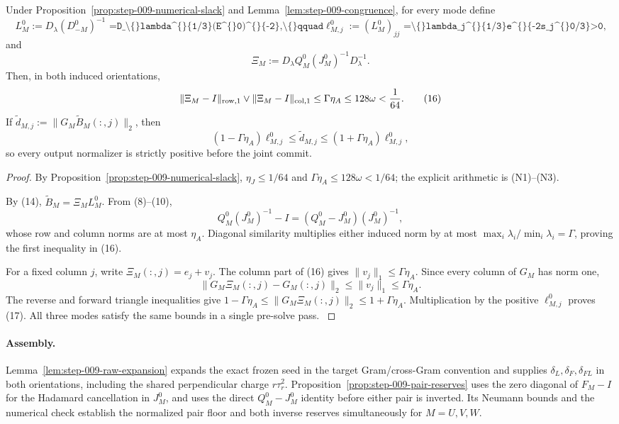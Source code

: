 \begin{proposition}\label{prop:step-009-normalizer}
Under Proposition~\ref{prop:step-009-numerical-slack}
and Lemma~\ref{lem:step-009-congruence}, for
every mode define
\[
L_M^0:=D_\lambda(D_{-M}^0)^{-1}
\texttt{   =D\_\textbackslash\{\}lambda\textasciicircum\{\}\{1/3\}(E\textasciicircum\{\}0)\textasciicircum\{\}\{-2\},\textbackslash\{\}qquad}
\ell_{M,j}^0:=(L_M^0)_{jj}
\texttt{   =\textbackslash\{\}lambda\_j\textasciicircum\{\}\{1/3\}e\textasciicircum\{\}\{-2s\_j\textasciicircum\{\}0/3\}>0,}
\]
and
\[
\Xi_M:=D_\lambda Q_M^0(J_M^0)^{-1}D_\lambda^{-1}.
\]
Then, in both induced orientations,
\[
\|\Xi_M-I\|_{\rm row,1}\vee\|\Xi_M-I\|_{\rm col,1}
\le\Gamma\eta_A\le128\omega<\frac1{64}. \tag{16}
\]
If \(\widetilde d_{M,j}:=\|G_M\widetilde B_M(:,j)\|_2\), then
\[
(1-\Gamma\eta_A)\ell_{M,j}^0
\le\widetilde d_{M,j}
\le(1+\Gamma\eta_A)\ell_{M,j}^0, \tag{17}
\]
so every output normalizer is strictly positive before the joint commit.

\begin{proof}

By Proposition~\ref{prop:step-009-numerical-slack}, \(\eta_J\le1/64\) and
\(\Gamma\eta_A\le128\omega<1/64\); the explicit arithmetic is (N1)--(N3).

By (14), \(\widetilde B_M=\Xi_M L_M^0\). From (8)--(10),
\[
Q_M^0(J_M^0)^{-1}-I
=(Q_M^0-J_M^0)(J_M^0)^{-1},
\]
whose row and column norms are at most \(\eta_A\). Diagonal similarity
multiplies either induced norm by at most
\(\max_i\lambda_i/\min_i\lambda_i=\Gamma\), proving the first inequality
in (16).

For a fixed column \(j\), write \(\Xi_M(:,j)=e_j+v_j\). The column part of
(16) gives \(\|v_j\|_1\le\Gamma\eta_A\). Since every column of \(G_M\) has
norm one,
\[
\|G_M\Xi_M(:,j)-G_M(:,j)\|_2
\le\|v_j\|_1\le\Gamma\eta_A.
\]
The reverse and forward triangle inequalities give
\(1-\Gamma\eta_A\le\|G_M\Xi_M(:,j)\|_2
\le1+\Gamma\eta_A\). Multiplication by the positive
\(\ell_{M,j}^0\) proves (17). All three modes satisfy the same bounds in a
single pre-solve pass. \(\)

\end{proof}
\end{proposition}
\paragraph{Assembly.}

Lemma~\ref{lem:step-009-raw-expansion} expands the exact frozen seed in the
target Gram/cross-Gram convention and supplies \(\delta_L,\delta_F,\delta_{FL}\)
in both orientations, including the shared perpendicular charge
\(r\tau_r^2\). Proposition~\ref{prop:step-009-pair-reserves} uses the zero
diagonal of \(F_M-I\) for the Hadamard cancellation in \(J_M^0\), and uses
the direct \(Q_M^0-J_M^0\) identity before either pair is inverted. Its
Neumann bounds and the numerical check establish the normalized pair floor
and both inverse reserves simultaneously for \(M=U,V,W\).

